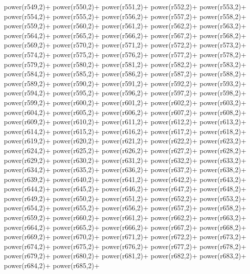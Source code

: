 \begin{DoxyCode}
{    power(r549,2)+
    power(r550,2)+
    power(r551,2)+
    power(r552,2)+
    power(r553,2)+
    power(r554,2)+
    power(r555,2)+
    power(r556,2)+
    power(r557,2)+
    power(r558,2)+
    power(r559,2)+
    power(r560,2)+
    power(r561,2)+
    power(r562,2)+
    power(r563,2)+
    power(r564,2)+
    power(r565,2)+
    power(r566,2)+
    power(r567,2)+
    power(r568,2)+
    power(r569,2)+
    power(r570,2)+
    power(r571,2)+
    power(r572,2)+
    power(r573,2)+
    power(r574,2)+
    power(r575,2)+
    power(r576,2)+
    power(r577,2)+
    power(r578,2)+
    power(r579,2)+
    power(r580,2)+
    power(r581,2)+
    power(r582,2)+
    power(r583,2)+
    power(r584,2)+
    power(r585,2)+
    power(r586,2)+
    power(r587,2)+
    power(r588,2)+
    power(r589,2)+
    power(r590,2)+
    power(r591,2)+
    power(r592,2)+
    power(r593,2)+
    power(r594,2)+
    power(r595,2)+
    power(r596,2)+
    power(r597,2)+
    power(r598,2)+
    power(r599,2)+
    power(r600,2)+
    power(r601,2)+
    power(r602,2)+
    power(r603,2)+
    power(r604,2)+
    power(r605,2)+
    power(r606,2)+
    power(r607,2)+
    power(r608,2)+
    power(r609,2)+
    power(r610,2)+
    power(r611,2)+
    power(r612,2)+
    power(r613,2)+
    power(r614,2)+
    power(r615,2)+
    power(r616,2)+
    power(r617,2)+
    power(r618,2)+
    power(r619,2)+
    power(r620,2)+
    power(r621,2)+
    power(r622,2)+
    power(r623,2)+
    power(r624,2)+
    power(r625,2)+
    power(r626,2)+
    power(r627,2)+
    power(r628,2)+
    power(r629,2)+
    power(r630,2)+
    power(r631,2)+
    power(r632,2)+
    power(r633,2)+
    power(r634,2)+
    power(r635,2)+
    power(r636,2)+
    power(r637,2)+
    power(r638,2)+
    power(r639,2)+
    power(r640,2)+
    power(r641,2)+
    power(r642,2)+
    power(r643,2)+
    power(r644,2)+
    power(r645,2)+
    power(r646,2)+
    power(r647,2)+
    power(r648,2)+
    power(r649,2)+
    power(r650,2)+
    power(r651,2)+
    power(r652,2)+
    power(r653,2)+
    power(r654,2)+
    power(r655,2)+
    power(r656,2)+
    power(r657,2)+
    power(r658,2)+
    power(r659,2)+
    power(r660,2)+
    power(r661,2)+
    power(r662,2)+
    power(r663,2)+
    power(r664,2)+
    power(r665,2)+
    power(r666,2)+
    power(r667,2)+
    power(r668,2)+
    power(r669,2)+
    power(r670,2)+
    power(r671,2)+
    power(r672,2)+
    power(r673,2)+
    power(r674,2)+
    power(r675,2)+
    power(r676,2)+
    power(r677,2)+
    power(r678,2)+
    power(r679,2)+
    power(r680,2)+
    power(r681,2)+
    power(r682,2)+
    power(r683,2)+
    power(r684,2)+
    power(r685,2)+
}
\end{DoxyCode}
